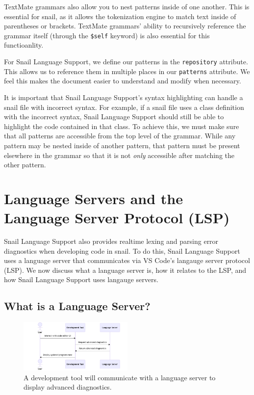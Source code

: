 \documentclass{article}
\begin{document}
TextMate grammars also allow you to nest patterns inside of one another. This is essential for snail, as it allows the tokenization engine to match text inside of parentheses or brackets. TextMate grammars' ability to recursively reference the grammar itself (through the \lstinline{$self} keyword) is also essential for this functioanlity. 

For Snail Language Support, we define our patterns in the \lstinline{repository} attribute. This allows us to reference them in multiple places in our \lstinline{patterns} attribute. We feel this makes the document easier to understand and modify when necessary. 

It is important that Snail Language Support's syntax highlighting can handle a snail file with incorrect syntax. For example, if a snail file uses a class definition with the incorrect syntax, Snail Language Support should still be able to highlight the code contained in that class. To achieve this, we must make sure that all patterns are accessible from the top level of the grammar. While any pattern may be nested inside of another pattern, that pattern must be present elsewhere in the grammar so that it is not \emph{only} accessible after matching the other pattern.

\section{Language Servers and the Language Server Protocol (LSP)}

Snail Language Support also provides realtime lexing and parsing error diagnostics when developing code in snail. To do this, Snail Language Support uses a language server that communicates via VS Code's langauge server protocol (LSP). We now discuss what a language server is, how it relates to the LSP, and how Snail Language Support uses langauge servers. 

\subsection{What is a Language Server?}

\begin{figure}
    \begin{center}
        \includegraphics[width=0.5\textwidth]{png/language-server.png}
        \caption{
            \centering 
            A development tool will communicate with a language server to display advanced diagnostics.
        }
        \label{fig:language-server}
    \end{center}
\end{figure}
\end{document}
